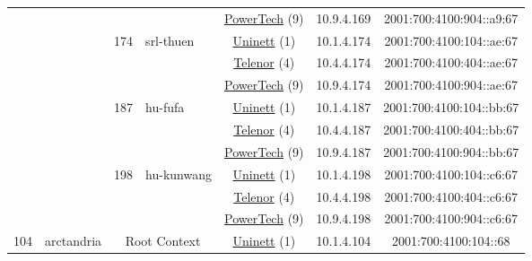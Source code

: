 \begin{small}
\begin{center}
\begin{longtable}{|c|c|c|c|c|c|c|c|}
  &  &  &  & \multicolumn{2}{|c|}{\tiny{\href{http://www.powertech.no}{PowerTech} (9)}} & \tiny{10.9.4.169} & \tiny{2001:700:4100:904::a9:67} \\* \cline{3-3}\cline{4-4}\cline{5-5}\cline{6-6}\cline{7-7}\cline{8-8}
  &  & \multirow{3}{*}{\tiny{174}} & \multicolumn{1}{|l|}{\multirow{3}{*}{\tiny{srl-thuen}}} & \multicolumn{2}{|c|}{\tiny{\href{https://www.uninett.no}{Uninett} (1)}} & \tiny{10.1.4.174} & \tiny{2001:700:4100:104::ae:67} \\* \cline{5-5}\cline{6-6}\cline{7-7}\cline{8-8}
  &  &  &  & \multicolumn{2}{|c|}{\tiny{\href{https://www.telenor.no}{Telenor} (4)}} & \tiny{10.4.4.174} & \tiny{2001:700:4100:404::ae:67} \\* \cline{5-5}\cline{6-6}\cline{7-7}\cline{8-8}
  &  &  &  & \multicolumn{2}{|c|}{\tiny{\href{http://www.powertech.no}{PowerTech} (9)}} & \tiny{10.9.4.174} & \tiny{2001:700:4100:904::ae:67} \\* \cline{3-3}\cline{4-4}\cline{5-5}\cline{6-6}\cline{7-7}\cline{8-8}
  &  & \multirow{3}{*}{\tiny{187}} & \multicolumn{1}{|l|}{\multirow{3}{*}{\tiny{hu-fufa}}} & \multicolumn{2}{|c|}{\tiny{\href{https://www.uninett.no}{Uninett} (1)}} & \tiny{10.1.4.187} & \tiny{2001:700:4100:104::bb:67} \\* \cline{5-5}\cline{6-6}\cline{7-7}\cline{8-8}
  &  &  &  & \multicolumn{2}{|c|}{\tiny{\href{https://www.telenor.no}{Telenor} (4)}} & \tiny{10.4.4.187} & \tiny{2001:700:4100:404::bb:67} \\* \cline{5-5}\cline{6-6}\cline{7-7}\cline{8-8}
  &  &  &  & \multicolumn{2}{|c|}{\tiny{\href{http://www.powertech.no}{PowerTech} (9)}} & \tiny{10.9.4.187} & \tiny{2001:700:4100:904::bb:67} \\* \cline{3-3}\cline{4-4}\cline{5-5}\cline{6-6}\cline{7-7}\cline{8-8}
  &  & \multirow{3}{*}{\tiny{198}} & \multicolumn{1}{|l|}{\multirow{3}{*}{\tiny{hu-kunwang}}} & \multicolumn{2}{|c|}{\tiny{\href{https://www.uninett.no}{Uninett} (1)}} & \tiny{10.1.4.198} & \tiny{2001:700:4100:104::c6:67} \\* \cline{5-5}\cline{6-6}\cline{7-7}\cline{8-8}
  &  &  &  & \multicolumn{2}{|c|}{\tiny{\href{https://www.telenor.no}{Telenor} (4)}} & \tiny{10.4.4.198} & \tiny{2001:700:4100:404::c6:67} \\* \cline{5-5}\cline{6-6}\cline{7-7}\cline{8-8}
  &  &  &  & \multicolumn{2}{|c|}{\tiny{\href{http://www.powertech.no}{PowerTech} (9)}} & \tiny{10.9.4.198} & \tiny{2001:700:4100:904::c6:67} \\ \hline
 \multirow{36}{*}{\tiny{104}} & \multicolumn{1}{|l|}{\multirow{36}{*}{\tiny{arctandria}}} & \multicolumn{2}{|c|}{\multirow{3}{*}{\tiny{Root Context}}} & \multicolumn{2}{|c|}{\tiny{\href{https://www.uninett.no}{Uninett} (1)}} & \tiny{10.1.4.104} & \tiny{2001:700:4100:104::68} \\* \cline{5-5}\cline{6-6}\cline{7-7}\cline{8-8}

\end{longtable}
\end{center}
\end{small}
